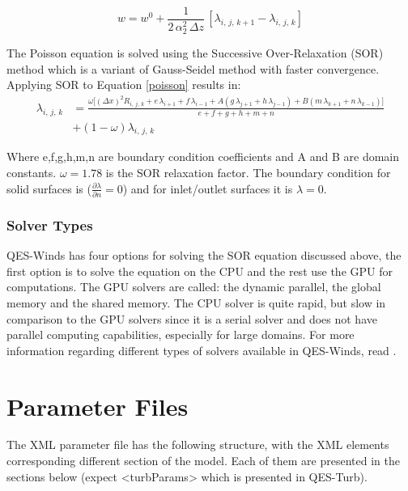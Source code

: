 \begin{equation}
\label{eu-lag3}
 w = w^0 + \frac{1}{2\,\alpha_2^2\,\Delta z}\,[\lambda_{i,\,j,\,k+1}-\lambda_{i,\,j,\,k}]
\end{equation}

The Poisson equation is solved using the Successive Over-Relaxation (SOR) method which is a variant of Gauss-Seidel method with faster convergence. Applying SOR to Equation \ref{poisson} results in:
\begin{equation}
\label{SOR}
\begin{split}
 \lambda_{i,\,j,\,k} & = \frac{\omega\Bigg[(\Delta x)^2 R_{i,\,j,\,k}+e\,\lambda_{i+1}+f\, \lambda_{i-1}+A(g\,\lambda_{j+1}+h\, \lambda_{j-1}) + B(m\,\lambda_{k+1}+n\, \lambda_{k-1})\Bigg]}{e+f+g+h+m+n}\\
 & +(1-\omega)\lambda_{i,\,j,\,k}
 \end{split}
\end{equation}

Where e,f,g,h,m,n are boundary condition coefficients and A and B are domain constants. $\omega = 1.78$ is the SOR relaxation factor. The boundary condition for solid surfaces is ($\frac{\partial \lambda}{\partial n}=0$) and for inlet/outlet surfaces it is $\lambda=0$.


\subsubsection{Solver Types}

QES-Winds has four options for solving the SOR equation discussed above, the first option is to solve the equation on the CPU and the rest use the GPU for computations. The GPU solvers are called: the dynamic parallel, the global memory and the shared memory. The CPU solver is quite rapid, but slow in comparison to the GPU solvers since it is a serial solver and does not have parallel computing capabilities, especially for large domains. For more information regarding different types of solvers available in QES-Winds, read \cite{Bozorgmehr2021}.

\section{Parameter Files}

The XML parameter file has the following structure, with the XML elements corresponding different section of the model. Each of them are presented in the sections below (expect <turbParams> which is presented in QES-Turb).

